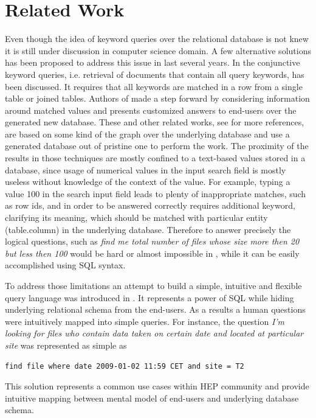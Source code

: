 \documentclass[1p,times]{elsarticle}
\begin{document}

\section{Related Work\label{RelatedWork}}
Even though the idea of keyword queries over the relational database
is not knew it is still under discussion in computer science domain.
A few alternative solutions has been proposed to address this issue
in last several years. In \cite{DBXplorer} the conjunctive keyword queries,
i.e. retrieval of documents that contain all query keywords, has
been discussed. It requires that all keywords are matched in a row from a
single table or joined tables. Authors of \cite{QueryAnswer} made a step forward
by considering information around matched values and presents customized answers to
end-users over the generated new database. These and other related 
works, see \cite{DBXplorer, QueryAnswer} for more references,
are based on some kind of the graph over the underlying database and
use a generated database out of pristine one to perform the work.
The proximity of the results in those techniques 
are mostly confined to a text-based values stored in a database, since 
usage of numerical values in the input search field is mostly useless without 
knowledge of the context of the value. For example, typing a value 100 
in the search input field leads to plenty of inappropriate matches, 
such as row ids, and in order to be
answered correctly requires additional keyword, clarifying its meaning, 
which should be matched with particular
entity (table.column) in the underlying database.
Therefore to answer precisely the logical questions, such as  
{\it find me total number of files whose size more then 20 but less then 
100} would be hard or almost impossible in \cite{DBXplorer, QueryAnswer}, 
while it can be easily accomplished using SQL syntax. 

To address those limitations an attempt to build a simple, intuitive and 
flexible query language was introduced in \cite{DBS-QL}.
It represents a power of SQL while hiding underlying relational schema from 
the end-users. As a results a human questions were intuitively mapped into 
simple queries. For instance, the question
{\it I'm looking for files who contain data taken on certain date and located at
particular site} was represented as simple as \cite{DBS-QL}
\begin{verbatim}
find file where date 2009-01-02 11:59 CET and site = T2
\end{verbatim}
This solution represents a common use cases within HEP community and provide
intuitive mapping between mental model of end-users and underlying database schema.
\end{document}
